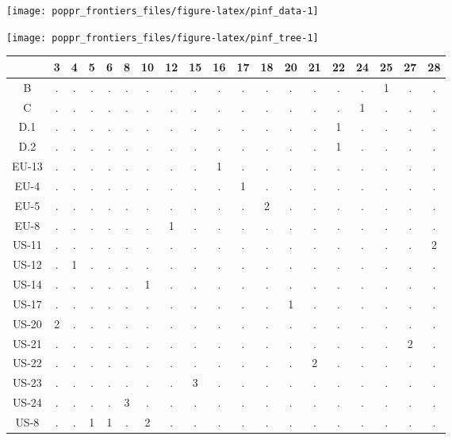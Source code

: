 \documentclass{frontiersSCNS} %
\newenvironment{CodeChunk}{}{}
\begin{document}
\begin{CodeChunk}

\texttt{[image: poppr\_frontiers\_files/figure-latex/pinf\_data-1]} \end{CodeChunk}\begin{CodeChunk}

\texttt{[image: poppr\_frontiers\_files/figure-latex/pinf\_tree-1]} \end{CodeChunk}\begin{table}[ht]
\centering
\begin{tabular}{ccccccccccccccccccc}
  \hline
 & 3 & 4 & 5 & 6 & 8 & 10 & 12 & 15 & 16 & 17 & 18 & 20 & 21 & 22 & 24 & 25 & 27 & 28 \\ 
  \hline
B & . & . & . & . & . & . & . & . & . & . & . & . & . & . & . & 1 & . & . \\ 
  C & . & . & . & . & . & . & . & . & . & . & . & . & . & . & 1 & . & . & . \\ 
  D.1 & . & . & . & . & . & . & . & . & . & . & . & . & . & 1 & . & . & . & . \\ 
  D.2 & . & . & . & . & . & . & . & . & . & . & . & . & . & 1 & . & . & . & . \\ 
  EU-13 & . & . & . & . & . & . & . & . & 1 & . & . & . & . & . & . & . & . & . \\ 
  EU-4 & . & . & . & . & . & . & . & . & . & 1 & . & . & . & . & . & . & . & . \\ 
  EU-5 & . & . & . & . & . & . & . & . & . & . & 2 & . & . & . & . & . & . & . \\ 
  EU-8 & . & . & . & . & . & . & 1 & . & . & . & . & . & . & . & . & . & . & . \\ 
  US-11 & . & . & . & . & . & . & . & . & . & . & . & . & . & . & . & . & . & 2 \\ 
  US-12 & . & 1 & . & . & . & . & . & . & . & . & . & . & . & . & . & . & . & . \\ 
  US-14 & . & . & . & . & . & 1 & . & . & . & . & . & . & . & . & . & . & . & . \\ 
  US-17 & . & . & . & . & . & . & . & . & . & . & . & 1 & . & . & . & . & . & . \\ 
  US-20 & 2 & . & . & . & . & . & . & . & . & . & . & . & . & . & . & . & . & . \\ 
  US-21 & . & . & . & . & . & . & . & . & . & . & . & . & . & . & . & . & 2 & . \\ 
  US-22 & . & . & . & . & . & . & . & . & . & . & . & . & 2 & . & . & . & . & . \\ 
  US-23 & . & . & . & . & . & . & . & 3 & . & . & . & . & . & . & . & . & . & . \\ 
  US-24 & . & . & . & . & 3 & . & . & . & . & . & . & . & . & . & . & . & . & . \\ 
  US-8 & . & . & 1 & 1 & . & 2 & . & . & . & . & . & . & . & . & . & . & . & . \\ 
   \hline
\end{tabular}
\end{table}
\end{document}
